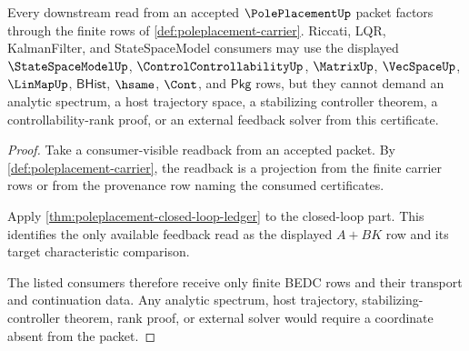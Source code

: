 \begin{theorem}
\label{thm:poleplacement-consumer-boundary}
Every downstream read from an accepted $\PolePlacementUp$ packet factors
through the finite rows of \autoref{def:poleplacement-carrier}. Riccati, LQR,
KalmanFilter, and StateSpaceModel consumers may use the displayed
$\StateSpaceModelUp$, $\ControlControllabilityUp$, $\MatrixUp$, $\VecSpaceUp$,
$\LinMapUp$, $\mathsf{BHist}$, $\hsame$, $\Cont$, and $\mathsf{Pkg}$ rows, but
they cannot demand an analytic spectrum, a host trajectory space, a
stabilizing controller theorem, a controllability-rank proof, or an external
feedback solver from this certificate.
\end{theorem}
\begin{proof}
Take a consumer-visible readback from an accepted packet. By
\autoref{def:poleplacement-carrier}, the readback is a projection from the
finite carrier rows or from the provenance row naming the consumed
certificates.

Apply \autoref{thm:poleplacement-closed-loop-ledger} to the closed-loop part.
This identifies the only available feedback read as the displayed $A+BK$ row
and its target characteristic comparison.

The listed consumers therefore receive only finite BEDC rows and their
transport and continuation data. Any analytic spectrum, host trajectory,
stabilizing-controller theorem, rank proof, or external solver would require a
coordinate absent from the packet.
\end{proof}

